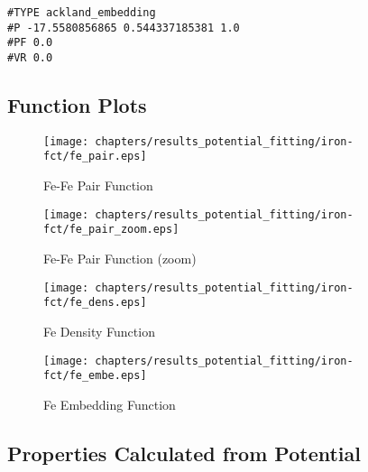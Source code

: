\begin{lstlisting}[style=sPseudo,caption={Embedding functional: fe\_embe.pot}]
#TYPE ackland_embedding
#P -17.5580856865 0.544337185381 1.0 
#PF 0.0 
#VR 0.0
\end{lstlisting}



\FloatBarrier
\subsection{Function Plots}

\begin{figure}[ht] 
  \begin{minipage}[b]{0.5\linewidth}
    \centering
    \texttt{[image: chapters/results\_potential\_fitting/iron-fct/fe\_pair.eps]} 
    \caption{Fe-Fe Pair Function} 

  \end{minipage}%
  \begin{minipage}[b]{0.5\linewidth}
    \centering
    \texttt{[image: chapters/results\_potential\_fitting/iron-fct/fe\_pair\_zoom.eps]} 
    \caption{Fe-Fe Pair Function (zoom)} 
  \end{minipage} 
  \begin{minipage}[b]{0.5\linewidth}
    \centering
    \texttt{[image: chapters/results\_potential\_fitting/iron-fct/fe\_dens.eps]} 
    \caption{Fe Density Function} 
  \end{minipage}%
  \begin{minipage}[b]{0.5\linewidth}
    \centering
    \texttt{[image: chapters/results\_potential\_fitting/iron-fct/fe\_embe.eps]} 
    \caption{Fe Embedding Function} 
  \end{minipage} 
  \label{fig:ironPotentialPlots} 
\end{figure}


\FloatBarrier
\subsection{Properties Calculated from Potential}



